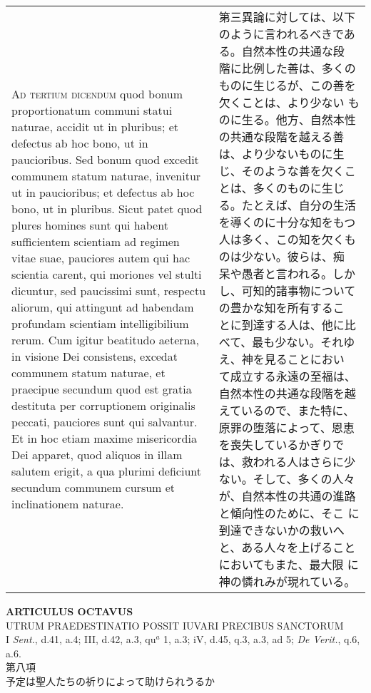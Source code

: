 \documentclass[10pt]{jsarticle} %
\begin{document}
\begin{longtable}{p{21em}p{21em}}
\\


{\scshape Ad tertium dicendum} quod bonum proportionatum
communi statui naturae, accidit ut in pluribus; et defectus ab hoc bono,
ut in paucioribus. Sed bonum quod excedit communem statum naturae,
invenitur ut in paucioribus; et defectus ab hoc bono, ut in
pluribus. Sicut patet quod plures homines sunt qui habent sufficientem
scientiam ad regimen vitae suae, pauciores autem qui hac scientia
carent, qui moriones vel stulti dicuntur, sed paucissimi sunt, respectu
aliorum, qui attingunt ad habendam profundam scientiam intelligibilium
rerum. Cum igitur beatitudo aeterna, in visione Dei consistens, excedat
communem statum naturae, et praecipue secundum quod est gratia destituta
per corruptionem originalis peccati, pauciores sunt qui salvantur. Et in
hoc etiam maxime misericordia Dei apparet, quod aliquos in illam salutem
erigit, a qua plurimi deficiunt secundum communem cursum et
inclinationem naturae.


&

第三異論に対しては、以下のように言われるべきである。自然本性の共通な段
階に比例した善は、多くのものに生じるが、この善を欠くことは、より少ない
ものに生る。他方、自然本性の共通な段階を越える善は、より少ないものに生
じ、そのような善を欠くことは、多くのものに生じる。たとえば、自分の生活
を導くのに十分な知をもつ人は多く、この知を欠くものは少ない。彼らは、痴
呆や愚者と言われる。しかし、可知的諸事物についての豊かな知を所有するこ
とに到達する人は、他に比べて、最も少ない。それゆえ、神を見ることにおい
て成立する永遠の至福は、自然本性の共通な段階を越えているので、また特に、
原罪の堕落によって、恩恵を喪失しているかぎりでは、救われる人はさらに少
ない。そして、多くの人々が、自然本性の共通の進路と傾向性のために、そこ
に到達できないかの救いへと、ある人々を上げることにおいてもまた、最大限
に神の憐れみが現れている。


\end{longtable}
\newpage





\begin{center}
 {\Large {\bf ARTICULUS OCTAVUS}}\\
 {\large UTRUM PRAEDESTINATIO POSSIT IUVARI PRECIBUS SANCTORUM}\\
 {\footnotesize I {\itshape Sent.}, d.41, a.4; III, d.42, a.3, qu$^a$ 1,
 a.3; iV, d.45, q.3, a.3, ad 5; {\itshape De Verit.}, q.6, a.6.}\\
 {\Large 第八項\\予定は聖人たちの祈りによって助けられうるか}
\end{center}
\end{document}
